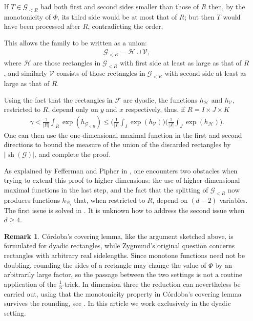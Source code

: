 \documentclass[oneside]{amsart}
\theoremstyle{definition}
\newtheorem*{remark*}{Remark}
\theoremstyle{plain}
\numberwithin{equation}{section}
\numberwithin{theorem}{section}
\newcommand{\sh}{\operatorname{sh}}
\begin{document}
If $T \in \mathcal{G}_{<R}$ had both first and second sides smaller than those
of $R$ then, by the monotonicity of $\Phi$, its third side would be at most that
of $R$; but then $T$ would have been processed after $R$, contradicting the
order.

This allows the family to be written as a union:
\begin{align*}
  \mathcal{G}_{<R} = \mathcal{H} \cup \mathcal{V},
\end{align*}
where $\mathcal{H}$ are those rectangles in $\mathcal{G}_{<R}$ with first side
at least as large as that of $R$, and similarly $\mathcal{V}$ consists of those
rectangles in $\mathcal{G}_{<R}$ with second side at least as large as that of
$R$.

Using the fact that the rectangles in $\mathcal{F}$ are dyadic, the functions
$h_{\mathcal{H}}$ and $h_{\mathcal{V}}$, restricted to $R$, depend only on $y$
and $x$ respectively, thus, if $R = I \times J \times K$
\begin{align*}
  \gamma < \frac{1}{|R|}\int_R \exp(h_{\mathcal{G}_{<R}}) \leq
  \bigg(\frac{1}{|I|} \int_I \exp(h_{\mathcal{V}})\bigg)
  \bigg( \frac{1}{|J|} \int_J\exp(h_{\mathcal{H}}) \bigg).
\end{align*}
One can then use the one-dimensional maximal function in the first and second
directions to bound the measure of the union of the discarded rectangles by
$|\sh(\mathcal{G})|$, and complete the proof.

As explained by Fefferman and Pipher in \cite{FeffermanPipher2005}, one
encounters two obstacles when trying to extend this proof to higher dimensions:
the use of higher-dimensional
maximal functions in the last step, and the fact that the splitting of
$\mathcal{G}_{<R}$ now produces functions $h_{\mathcal{B}_i}$ that, when
restricted to $R$, depend on $(d-2)$ variables. The first issue is solved in
\cite{FeffermanPipher2005}. It is unknown how to address the second issue when
$d \geq 4$.

\begin{remark*}
  Córdoba's covering lemma, like the argument sketched above, is formulated
  for dyadic rectangles, while Zygmund's original question concerns
  rectangles with arbitrary real sidelengths.
  Since monotone functions need not be doubling, rounding the sides of a
  rectangle may change the value of $\Phi$ by an arbitrarily large factor,
  so the passage between the two settings is not a routine application of
  the $\frac{1}{3}$-trick.
  In dimension three the reduction can nevertheless be carried out, using
  that the monotonicity property in Córdoba's covering lemma survives the
  rounding, see \cite{ADMM2023}.
  In this article we work exclusively in the dyadic setting.
\end{remark*}
\end{document}
